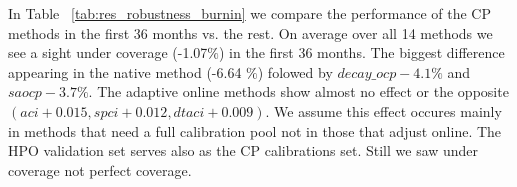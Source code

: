 In Table ~\ref{tab:res_robustness_burnin} we compare the performance of the CP methods in the first 36 months vs. the rest. On average over all 14 methods we see a sight under coverage (-1.07$\%$) in the first 36 months. The biggest difference appearing in the native method (-6.64 $\%$) folowed by $decay\_ocp -4.1\% $ and $ saocp -3.7\%$. The adaptive online methods show almost no effect or the opposite $(aci +0.015, spci +0.012, dtaci +0.009)$. We assume this effect occures mainly in methods that need a full calibration pool not in those that adjust online. The HPO validation set serves also as the CP calibrations set. Still we saw under coverage not perfect coverage.\\
